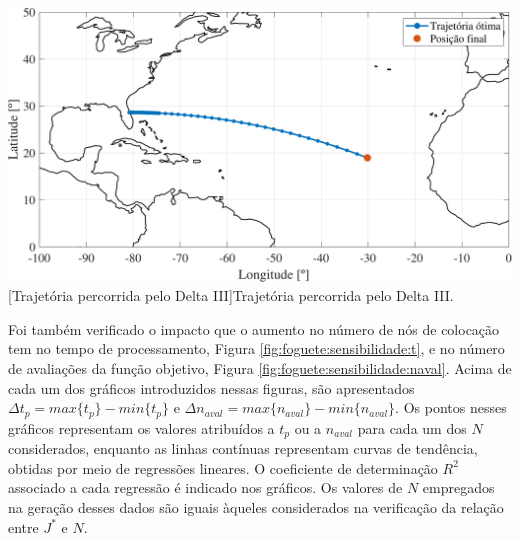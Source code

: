\noindent
\begin{minipage}{\textwidth}
	\vspace{\onelineskip}
	\centering
	\includegraphics[width=1\linewidth]{fig/resultados/foguete/obs/adv}
	[Trajetória percorrida pelo Delta III]{Trajetória percorrida pelo Delta III.}
	\label{fig:foguete:avancado}
	\vspace{\onelineskip}
\end{minipage}


Foi também verificado o impacto que o aumento no número de nós de colocação tem no tempo de processamento, Figura \ref{fig:foguete:sensibilidade:t}, e no número de avaliações da função objetivo, Figura \ref{fig:foguete:sensibilidade:naval}. Acima de cada um dos gráficos introduzidos nessas figuras, são apresentados $ \Delta t_p = max\{t_p\} - min\{t_p\} $ e $ \Delta n_{aval} = max\{n_{aval}\} - min\{n_{aval}\} $. Os pontos nesses gráficos representam os valores atribuídos a $ t_p $ ou a $ n_{aval} $ para cada um dos $ N $ considerados, enquanto as linhas contínuas representam curvas de tendência, obtidas por meio de regressões lineares. O coeficiente de determinação $ R^2 $ associado a cada regressão é indicado nos gráficos. Os valores de $ N $ empregados na geração desses dados são iguais àqueles considerados na verificação da relação entre $ J^* $ e $ N $. 

